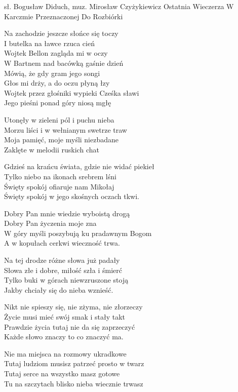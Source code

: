 {sł. Bogusław Diduch, muz. Mirosław Czyżykiewicz}
{Ostatnia Wieczerza W Karczmie Przeznaczonej Do Rozbiórki}
\begin{text}
\hfill\break
\vin Na zachodzie jeszcze słońce się toczy\\
\vin I butelka na ławce rzuca cień\\
\vin Wojtek Bellon zagląda mi w oczy\\
\vin W Bartnem nad bacówką gaśnie dzień\\
\vin Mówią, że gdy gram jego songi\\
\vin Głos mi drży, a do oczu płyną łzy\\
\vin Wojtek przez głośniki wypieki Cześka sławi\\
\vin Jego pieśni ponad góry niosą mgłę

Utonęły w zieleni pól i puchu nieba\\
Morzu liści i w wełnianym swetrze traw\\
Moja pamięć, moje myśli niezbadane\\
Zaklęte w melodii ruskich chat

Gdzieś na krańcu świata, gdzie nie widać piekieł\\
Tylko niebo na ikonach srebrem lśni\\
Święty spokój ofiaruje nam Mikołaj\\
Święty spokój w jego skośnych oczach tkwi.

\vin Dobry Pan mnie wiedzie wyboistą drogą\\
\vin Dobry Pan życzenia moje zna\\
\vin W góry myśli poszybują ku pradawnym Bogom\\
\vin A w kopułach cerkwi wieczność trwa.

\vin Na tej drodze różne słowa już padały\\
\vin Słowa złe i dobre, miłość szła i śmierć\\
\vin Tylko buki w górach niewzruszone stoją\\
\vin Jakby chciały się do nieba wznieść.

Nikt nie spieszy się, nie zżyma, nie złorzeczy\\
Życie musi mieć swój smak i stały takt\\
Prawdzie życia tutaj nie da się zaprzeczyć\\
Każde słowo znaczy to co znaczyć ma.

Nie ma miejsca na rozmowy ukradkowe\\
Tutaj ludziom musisz patrzeć prosto w twarz\\
Tutaj serce na wszystko masz gotowe\\
Tu na szczytach blisko nieba wiecznie trwasz
\end{text}
